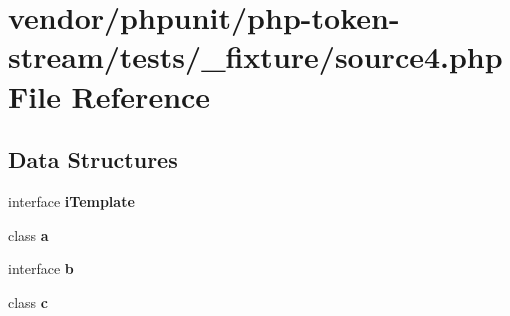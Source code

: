 \section{vendor/phpunit/php-\/token-\/stream/tests/\+\_\+fixture/source4.php File Reference}
\label{source4_8php}
\subsection*{Data Structures}
\begin{DoxyCompactItemize}
\item 
interface {\bf i\+Template}
\item 
class {\bf a}
\item 
interface {\bf b}
\item 
class {\bf c}
\end{DoxyCompactItemize}
